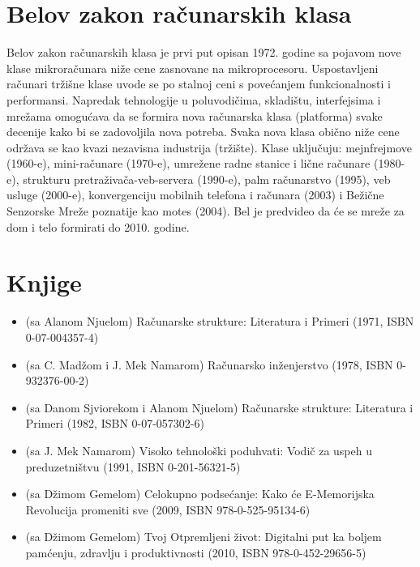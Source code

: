 \documentclass[a4paper]{article}
\begin{document}
{\section{Belov zakon računarskih klasa}
\label{slike_i_tabele}

Belov zakon računarskih klasa \cite{bel9} je prvi put opisan 1972. godine sa pojavom nove klase mikroračunara niže cene zasnovane na mikroprocesoru. Uspostavljeni računari tržišne klase uvode se po stalnoj ceni s povećanjem funkcionalnosti i performansi. Napredak tehnologije u poluvodičima, skladištu, interfejsima i mrežama omogućava da se formira nova računarska klasa (platforma) svake decenije kako bi se zadovoljila nova potreba. Svaka nova klasa obično niže cene održava se kao kvazi nezavisna industrija (tržište). Klase uključuju: mejnfrejmove (1960-e), mini-računare (1970-e), umrežene radne stanice i lične računare (1980-e), strukturu pretraživača-veb-servera (1990-e), palm računarstvo (1995), veb usluge (2000-e), konvergenciju mobilnih telefona i računara (2003) i Bežične Senzorske Mreže poznatije kao motes (2004). Bel je predvideo da će se mreže za dom i telo formirati do 2010. godine.

\section{Knjige}
\label{sec:naslov1}

\begin{itemize}
\item (sa Alanom Njuelom) Računarske strukture: Literatura i Primeri (1971, ISBN 0-07-004357-4)
\item (sa C. Madžom i J. Mek Namarom) Računarsko inženjerstvo (1978, ISBN 0-932376-00-2)
\item (sa Danom Sjviorekom i Alanom Njuelom) Računarske strukture: Literatura i Primeri (1982, ISBN 0-07-057302-6)
\item (sa J. Mek Namarom) Visoko tehnološki poduhvati: Vodič za uspeh u preduzetništvu (1991, ISBN 0-201-56321-5)
\item (sa Džimom Gemelom) Celokupno podsećanje: Kako će E-Memorijska Revolucija promeniti sve (2009, ISBN 978-0-525-95134-6)
\item (sa Džimom Gemelom) Tvoj Otpremljeni život: Digitalni put ka boljem pamćenju, zdravlju i produktivnosti (2010, ISBN 978-0-452-29656-5)


\end{itemize} 

\appendix
 


}
\end{document}
